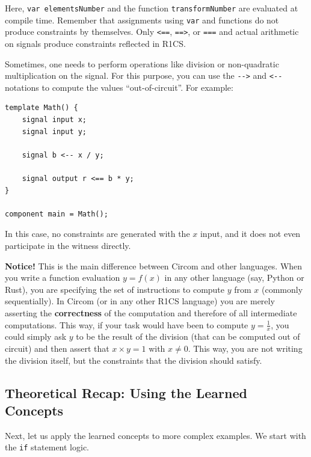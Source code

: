 \documentclass[../../book.tex]{subfiles}
\begin{document}
Here, \texttt{var elementsNumber} and the function \texttt{transformNumber}
are evaluated at compile time. Remember that assignments using \texttt{var} and
functions do not produce constraints by themselves. Only \texttt{<==},
\texttt{==>}, or \texttt{===} and actual arithmetic on signals produce
constraints reflected in R1CS.

\begin{remark}
    Sometimes, one needs to perform operations like division or non-quadratic multiplication on the signal.
    For this purpose, you can use the \texttt{{-}->} and \texttt{<-{-}} notations to compute the values ``out-of-circuit''. For example:

    \begin{lstlisting}[language=Circom,numbers=none]
template Math() {
    signal input x;
    signal input y;

    signal b <-- x / y;

    signal output r <== b * y;
}

component main = Math();
    \end{lstlisting}\label{code:division-example}

    In this case, no constraints are generated with the $x$ input, and it does not even participate in the witness directly.

    \textcolor{green!50!black}{\textbf{Notice!}} This is the main difference between Circom and other languages. When you
    write a function evaluation $y = f(x)$ in any other language (say, Python or Rust),
    you are specifying the set of instructions to compute $y$ from $x$ (commonly
    sequentially). In Circom (or in any other R1CS language) you are merely asserting
    the \textbf{correctness} of the computation and therefore of all
    intermediate computations. This way, if your task would have been to compute
    $y = \frac{1}{x}$, you could simply ask $y$ to be the result of the division
    (that can be computed out of circuit) and then assert that $x \times y = 1$
    with $x \neq 0$. This way, you are not writing the division itself, but
    the constraints that the division should satisfy.
\end{remark}

\subsection{Theoretical Recap: Using the Learned Concepts}

Next, let us apply the learned concepts to more complex examples. We start
with the \texttt{if} statement logic.
\end{document}
